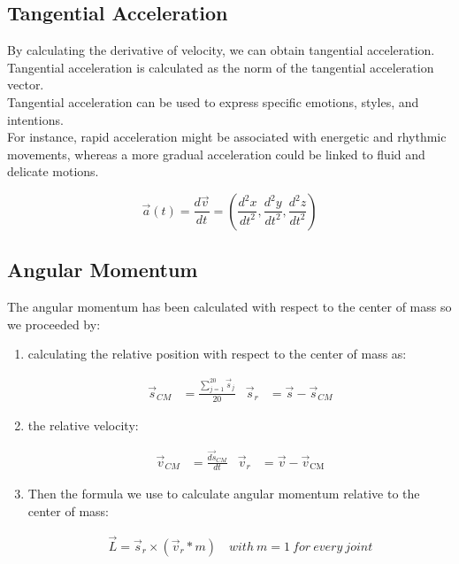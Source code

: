 \subsection{Tangential Acceleration}
By calculating the derivative of velocity, we can obtain tangential acceleration.
Tangential acceleration is calculated as the norm of the tangential acceleration vector. \\
Tangential acceleration can be used to express specific emotions, styles, and intentions. \\
For instance, rapid acceleration might be associated with energetic and rhythmic movements, whereas a more gradual acceleration could be linked to fluid and delicate motions.

\begin{equation}
  \vec{a}(t) = \frac{d\vec{v}}{dt} = \left(\frac{d^2x}{dt^2}, \frac{d^2y}{dt^2}, \frac{d^2z}{dt^2}\right)
\end{equation}

\subsection{Angular Momentum}
The angular momentum has been calculated with respect to the center of mass so we proceeded by:
\begin{enumerate}
  \item calculating the relative position with respect to the center of mass as: 
  \begin{figure}[H]
    \centering
    \begin{align}
        \vec{s}_{CM} &= \frac{{\sum_{j=1}^{20} \vec{s}_{j}}}{{20}} &
        \vec{s}_{r} &= \vec{s} - \vec{s}_{CM} \label{eq:rel_pos}
    \end{align}
  \end{figure}
  \item the relative velocity:
  \begin{figure}[H]
    \centering
    \begin{align}
        \vec{v}_{CM} &= \frac{\vec{ds}_{CM}}{dt} &
        \vec{v}_{r} &= \vec{v} - \vec{v}_{\text{CM}} \label{eq:rel_vel}
    \end{align}
  \end{figure}
  \item Then the formula we use to calculate angular momentum relative to the center of mass:
  \begin{figure}[H]
    \centering
    \begin{align}
      \vec{L} = \vec{s}_{r} \times (\vec{v}_{r} * m) \quad with \ m = 1 \ for \ every \ joint \label{eq:ang_mom}
    \end{align}
  \end{figure}
\end{enumerate}

